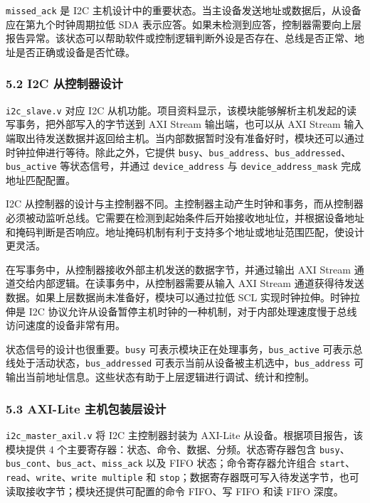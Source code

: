 \texttt{missed\_ack} 是 I2C 主机设计中的重要状态。当主设备发送地址或数据后，从设备应在第九个时钟周期拉低 SDA 表示应答。如果未检测到应答，控制器需要向上层报告异常。该状态可以帮助软件或控制逻辑判断外设是否存在、总线是否正常、地址是否正确或设备是否忙碌。

\subsubsection{5.2 I2C 从控制器设计}\label{i2c-ux4eceux63a7ux5236ux5668ux8bbeux8ba1}

\texttt{i2c\_slave.v} 对应 I2C 从机功能。项目资料显示，该模块能够解析主机发起的读写事务，把外部写入的字节送到 AXI Stream 输出端，也可以从 AXI Stream 输入端取出待发送数据并返回给主机。当内部数据暂时没有准备好时，模块还可以通过时钟拉伸进行等待。除此之外，它提供 \texttt{busy}、\texttt{bus\_address}、\texttt{bus\_addressed}、\texttt{bus\_active} 等状态信号，并通过 \texttt{device\_address} 与 \texttt{device\_address\_mask} 完成地址匹配配置。

I2C 从控制器的设计与主控制器不同。主控制器主动产生时钟和事务，而从控制器必须被动监听总线。它需要在检测到起始条件后开始接收地址位，并根据设备地址和掩码判断是否响应。地址掩码机制有利于支持多个地址或地址范围匹配，使设计更灵活。

在写事务中，从控制器接收外部主机发送的数据字节，并通过输出 AXI Stream 通道交给内部逻辑。在读事务中，从控制器需要从输入 AXI Stream 通道获得待发送数据。如果上层数据尚未准备好，模块可以通过拉低 SCL 实现时钟拉伸。时钟拉伸是 I2C 协议允许从设备暂停主机时钟的一种机制，对于内部处理速度慢于总线访问速度的设备非常有用。

状态信号的设计也很重要。\texttt{busy} 可表示模块正在处理事务，\texttt{bus\_active} 可表示总线处于活动状态，\texttt{bus\_addressed} 可表示当前从设备被主机选中，\texttt{bus\_address} 可输出当前地址信息。这些状态有助于上层逻辑进行调试、统计和控制。

\subsubsection{5.3 AXI-Lite 主机包装层设计}\label{axi-lite-ux4e3bux673aux5305ux88c5ux5c42ux8bbeux8ba1}

\texttt{i2c\_master\_axil.v} 将 I2C 主控制器封装为 AXI-Lite 从设备。根据项目报告，该模块提供 4 个主要寄存器：状态、命令、数据、分频。状态寄存器包含 \texttt{busy}、\texttt{bus\_cont}、\texttt{bus\_act}、\texttt{miss\_ack} 以及 FIFO 状态；命令寄存器允许组合 \texttt{start}、\texttt{read}、\texttt{write}、\texttt{write\ multiple} 和 \texttt{stop}；数据寄存器既可写入待发送字节，也可读取接收字节；模块还提供可配置的命令 FIFO、写 FIFO 和读 FIFO 深度。

